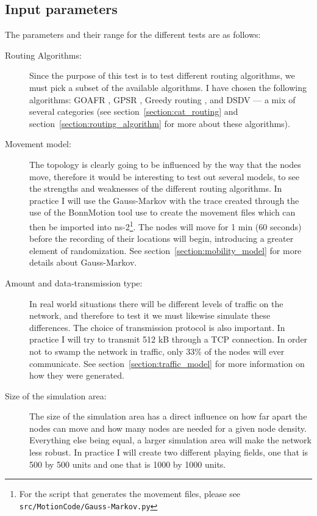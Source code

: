 \subsection{Input parameters}
\label{section:input_parameters}
The parameters and their range for the different tests are as follows:
\begin{description}
\item[Routing Algorithms:] Since the purpose of this test is to test different routing algorithms, we must pick a subset of the available algorithms. I have chosen the following algorithms: GOAFR \cite{gopher}, GPSR \cite{gpsr}, Greedy routing \cite{gopher}, and DSDV \cite{DSDV} --- a mix of several categories (see section~\ref{section:cat_routing} and section~\ref{section:routing_algorithm} for more about these algorithms).

\item[Movement model:] The topology is clearly going to be influenced by the way that the nodes move, therefore it would be interesting to test out several models, to see the strengths and weaknesses of the different routing algorithms. In practice I will use  the Gauss-Markov \cite{MobilityAdHocResearch} with the trace created through the use of the BonnMotion tool \cite{toilers} use to create the movement files which can then be imported into ns-2\footnote{For the script that generates the movement files, please see \texttt{src/MotionCode/Gauss-Markov.py}}. The nodes will move for 1 min (60 seconds) before the recording of their locations will begin, introducing a greater element of randomization. See section~\ref{section:mobility_model} for more details about Gauss-Markov.

\item[Amount and data-transmission type:] In real world situations there will be different levels of traffic on the network, and therefore to test it we must likewise simulate these differences. The choice of transmission protocol is also important. In practice I will try to transmit 512 kB through a TCP connection. In order not to swamp the network in traffic, only 33\% of the nodes will ever communicate. See section~\ref{section:traffic_model} for more information on how they were generated.

\item[Size of the simulation area:] The size of the simulation area has a direct influence on how far apart the nodes can move and how many nodes are needed for a given node density. Everything else being equal, a larger simulation area will make the network less robust. In practice I will create two different playing fields, one that is 500 by 500 units and one that is 1000 by 1000 units.


\end{description}
